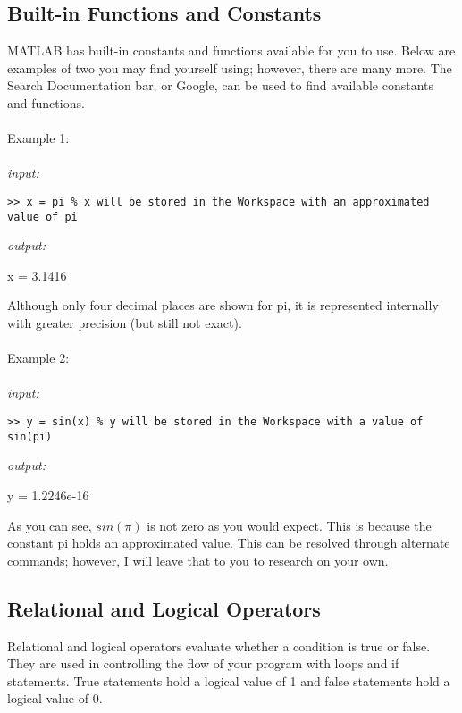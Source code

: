 \documentclass[../MATLAB_Primer.tex]{subfiles}
\begin{document}
\subsection{Built-in Functions and Constants}
MATLAB has built-in constants and functions available for you to use. Below are examples of two you may find yourself using; however, there are many more. The Search Documentation bar, or Google, can be used to find available constants and functions.
\\ \\ 
Example 1:
\\ \\
\textit{input:}
\begin{lstlisting}[frame=single]
>> x = pi % x will be stored in the Workspace with an approximated value of pi
\end{lstlisting}

\textit{output:}

\begin{center}
    x = 3.1416
\end{center}

Although only four decimal places are shown for pi, it is represented internally with greater precision (but still not exact).
\\ \\
Example 2:
\\ \\
\textit{input:}
\begin{lstlisting}[frame=single]
>> y = sin(x) % y will be stored in the Workspace with a value of sin(pi)
\end{lstlisting}

\textit{output:}

\begin{center}
    y = 1.2246e-16
\end{center}

As you can see, $sin(\pi)$ is not zero as you would expect. This is because the constant pi holds an approximated value. This can be resolved through alternate commands; however, I will leave that to you to research on your own.

\subsection{Relational and Logical Operators} \label{Relational and Logical Operators}
Relational and logical operators evaluate whether a condition is true or false. They are used in controlling the flow of your program with loops and if statements. True statements hold a logical value of 1 and false statements hold a logical value of 0.
\end{document}

